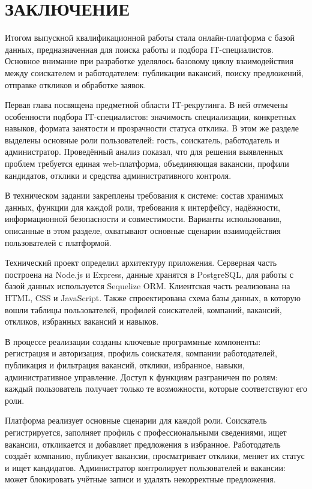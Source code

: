 \section*{ЗАКЛЮЧЕНИЕ}

Итогом выпускной квалификационной работы стала онлайн-платформа с базой данных, предназначенная для поиска работы и подбора IT-специалистов. Основное внимание при разработке уделялось базовому циклу взаимодействия между соискателем и работодателем: публикации вакансий, поиску предложений, отправке откликов и обработке заявок.

Первая глава посвящена предметной области IT-рекрутинга. В ней отмечены особенности подбора IT-специалистов: значимость специализации, конкретных навыков, формата занятости и прозрачности статуса отклика. В этом же разделе выделены основные роли пользователей: гость, соискатель, работодатель и администратор. Проведённый анализ показал, что для решения выявленных проблем требуется единая web-платформа, объединяющая вакансии, профили кандидатов, отклики и средства административного контроля.

В техническом задании закреплены требования к системе: состав хранимых данных, функции для каждой роли, требования к интерфейсу, надёжности, информационной безопасности и совместимости. Варианты использования, описанные в этом разделе, охватывают основные сценарии взаимодействия пользователей с платформой.

Технический проект определил архитектуру приложения. Серверная часть построена на Node.js и Express, данные хранятся в PostgreSQL, для работы с базой данных используется Sequelize ORM. Клиентская часть реализована на HTML, CSS и JavaScript. Также спроектирована схема базы данных, в которую вошли таблицы пользователей, профилей соискателей, компаний, вакансий, откликов, избранных вакансий и навыков.

В процессе реализации созданы ключевые программные компоненты: регистрация и авторизация, профиль соискателя, компании работодателей, публикация и фильтрация вакансий, отклики, избранное, навыки, административное управление. Доступ к функциям разграничен по ролям: каждый пользователь получает только те возможности, которые соответствуют его роли.

Платформа реализует основные сценарии для каждой роли. Соискатель регистрируется, заполняет профиль с профессиональными сведениями, ищет вакансии, откликается и добавляет предложения в избранное. Работодатель создаёт компанию, публикует вакансии, просматривает отклики, меняет их статус и ищет кандидатов. Администратор контролирует пользователей и вакансии: может блокировать учётные записи и удалять некорректные предложения.

